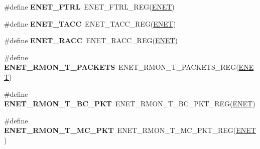 \begin{DoxyCompactItemize}
\item 
\#define {\bfseries E\+N\+E\+T\+\_\+\+F\+T\+RL}~E\+N\+E\+T\+\_\+\+F\+T\+R\+L\+\_\+\+R\+EG(\hyperlink{group__ENET__Peripheral__Access__Layer_ga4745105f505f3ab949d6a57fbe2a0ed5}{E\+N\+ET})\hypertarget{group__ENET__Register__Accessor__Macros_gaf0bf2bc9f38cc18b173e47f991e804a0}{}\label{group__ENET__Register__Accessor__Macros_gaf0bf2bc9f38cc18b173e47f991e804a0}

\item 
\#define {\bfseries E\+N\+E\+T\+\_\+\+T\+A\+CC}~E\+N\+E\+T\+\_\+\+T\+A\+C\+C\+\_\+\+R\+EG(\hyperlink{group__ENET__Peripheral__Access__Layer_ga4745105f505f3ab949d6a57fbe2a0ed5}{E\+N\+ET})\hypertarget{group__ENET__Register__Accessor__Macros_gaad331e25ed239795b63e6f0c546efbbb}{}\label{group__ENET__Register__Accessor__Macros_gaad331e25ed239795b63e6f0c546efbbb}

\item 
\#define {\bfseries E\+N\+E\+T\+\_\+\+R\+A\+CC}~E\+N\+E\+T\+\_\+\+R\+A\+C\+C\+\_\+\+R\+EG(\hyperlink{group__ENET__Peripheral__Access__Layer_ga4745105f505f3ab949d6a57fbe2a0ed5}{E\+N\+ET})\hypertarget{group__ENET__Register__Accessor__Macros_gab8cef4267c0501acfbe1f6d7e7bbf0c4}{}\label{group__ENET__Register__Accessor__Macros_gab8cef4267c0501acfbe1f6d7e7bbf0c4}

\item 
\#define {\bfseries E\+N\+E\+T\+\_\+\+R\+M\+O\+N\+\_\+\+T\+\_\+\+P\+A\+C\+K\+E\+TS}~E\+N\+E\+T\+\_\+\+R\+M\+O\+N\+\_\+\+T\+\_\+\+P\+A\+C\+K\+E\+T\+S\+\_\+\+R\+EG(\hyperlink{group__ENET__Peripheral__Access__Layer_ga4745105f505f3ab949d6a57fbe2a0ed5}{E\+N\+ET})\hypertarget{group__ENET__Register__Accessor__Macros_gaa86be980a2a0cdfa7133cbba2d02fd4d}{}\label{group__ENET__Register__Accessor__Macros_gaa86be980a2a0cdfa7133cbba2d02fd4d}

\item 
\#define {\bfseries E\+N\+E\+T\+\_\+\+R\+M\+O\+N\+\_\+\+T\+\_\+\+B\+C\+\_\+\+P\+KT}~E\+N\+E\+T\+\_\+\+R\+M\+O\+N\+\_\+\+T\+\_\+\+B\+C\+\_\+\+P\+K\+T\+\_\+\+R\+EG(\hyperlink{group__ENET__Peripheral__Access__Layer_ga4745105f505f3ab949d6a57fbe2a0ed5}{E\+N\+ET})\hypertarget{group__ENET__Register__Accessor__Macros_gadc3115bf35fbd9a601fb7fec5e8518e1}{}\label{group__ENET__Register__Accessor__Macros_gadc3115bf35fbd9a601fb7fec5e8518e1}

\item 
\#define {\bfseries E\+N\+E\+T\+\_\+\+R\+M\+O\+N\+\_\+\+T\+\_\+\+M\+C\+\_\+\+P\+KT}~E\+N\+E\+T\+\_\+\+R\+M\+O\+N\+\_\+\+T\+\_\+\+M\+C\+\_\+\+P\+K\+T\+\_\+\+R\+EG(\hyperlink{group__ENET__Peripheral__Access__Layer_ga4745105f505f3ab949d6a57fbe2a0ed5}{E\+N\+ET})\hypertarget{group__ENET__Register__Accessor__Macros_gab5d1774f09344c97cb14cb81205e0cff}{}\label{group__ENET__Register__Accessor__Macros_gab5d1774f09344c97cb14cb81205e0cff}


\end{DoxyCompactItemize}
